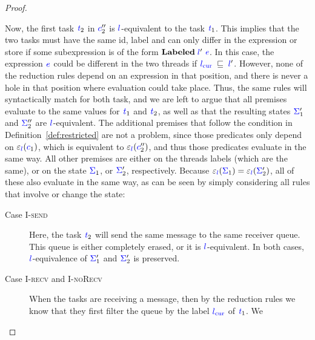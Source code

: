 \documentclass{llncs}
\newcommand{\Varid}[1]{\mathit{#1}}
\begin{document}
\begin{proof}
\begin{itemize}
    Now, the first task \ensuremath{\ifc{\Varid{t}}_{2}} in \ensuremath{\ifc{c}_{2}''} is \ensuremath{\ifc{l}}-equivalent to the task \ensuremath{\ifc{\Varid{t}}_{1}}.
    This implies that the two tasks must have the same id, label and
    can only differ in the expression or store if some subexpression
    is of the form \ensuremath{\mathbf{Labeled}\;\ifc{l}'\;\ifc{\Varid{e}}}.  In this case, the expression \ensuremath{\ifc{\Varid{e}}} could
    be different in the two threads if \ensuremath{\lcurr\;\flows{}\;\ifc{l}'}.  However, none of the reduction rules
    depend on an expression in that position, and there is never a
    hole in that position
    where evaluation could take place.  Thus, the same rules will syntactically
    match for both task, and we are left to argue that all premises
    evaluate to the same values for \ensuremath{\ifc{\Varid{t}}_{1}} and \ensuremath{\ifc{\Varid{t}}_{2}}, as well as that
    the resulting states \ensuremath{\ifc{\Sigma}_{1}'} and
    \ensuremath{\ifc{\Sigma}_{2}''} are \ensuremath{\ifc{l}}-equivalent.
    The additional premises  that follow
    the condition in Definition~\ref{def:restricted} are not a problem,
    since those
    predicates only depend on \ensuremath{\varepsilon_{\ifc{l}}(\ifc{c}_{1})}, which is equivalent
    to \ensuremath{\varepsilon_{\ifc{l}}(\ifc{c}_{2}'')}, and thus those predicates evaluate in the same way.
    All other premises are either on the threads labels (which are the same),
    or on the state \ensuremath{\ifc{\Sigma}_{1}}, or \ensuremath{\ifc{\Sigma}_{2}'}, respectively.  Because
    \ensuremath{\varepsilon_{\ifc{l}}(\ifc{\Sigma}_{1})\mathrel{=}\varepsilon_{\ifc{l}}(\ifc{\Sigma}_{2}')}, all of these also evaluate in the same way,
    as can be seen by simply considering all rules that involve or
    change the state:
    \begin{description}
      \item[Case \textsc{I-send}]
      Here, the task \ensuremath{\ifc{\Varid{t}}_{2}} will send the same message to the same
      receiver queue. This
      queue is either completely erased, or it is \ensuremath{\ifc{l}}-equivalent.  In both
      cases, \ensuremath{\ifc{l}}-equivalence of \ensuremath{\ifc{\Sigma}_{1}'} and \ensuremath{\ifc{\Sigma}_{2}'} is preserved.
      \item[Case \textsc{I-recv} and \textsc{I-noRecv}]
      When the tasks are receiving a message, then by the reduction rules
      we know that they first filter the queue by the label
      \ensuremath{\lcurr} of \ensuremath{\ifc{\Varid{t}}_{1}}.  We

\end{description}
\end{itemize}
\end{proof}
\end{document}
